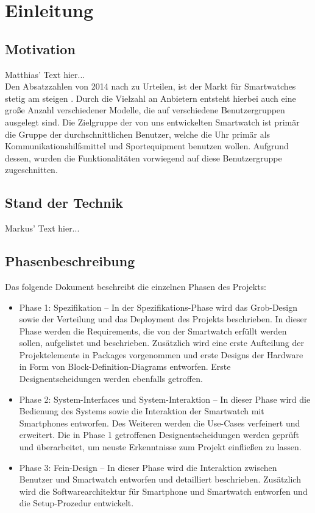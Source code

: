 \chapter{Einleitung}

\section{Motivation}
Matthias' Text hier...\\
Den Absatzzahlen von 2014 nach zu Urteilen, ist der Markt für Smartwatches stetig am steigen . Durch die Vielzahl an Anbietern entsteht hierbei auch eine große Anzahl verschiedener Modelle, die auf verschiedene Benutzergruppen ausgelegt sind. Die Zielgruppe der von uns entwickelten Smartwatch ist primär die Gruppe der durchschnittlichen Benutzer, welche die Uhr primär als Kommunikationshilfsmittel und Sportequipment benutzen wollen. Aufgrund dessen, wurden die Funktionalitäten  vorwiegend auf diese Benutzergruppe zugeschnitten.

\section{Stand der Technik}
Markus' Text hier...

\section{Phasenbeschreibung}
Das folgende Dokument beschreibt die einzelnen Phasen des Projekts:
\begin{itemize}
  \item Phase 1: Spezifikation -- In der Spezifikations-Phase wird das Grob-Design sowie der Verteilung und das Deployment des Projekts beschrieben. In dieser Phase werden die Requirements, die von der Smartwatch erfüllt werden sollen, aufgelistet und beschrieben. Zusätzlich wird eine erste Aufteilung der Projektelemente in Packages vorgenommen und erste Designs der Hardware in Form von Block-Definition-Diagrams entworfen. Erste Designentscheidungen werden ebenfalls getroffen.

  \item Phase 2: System-Interfaces und System-Interaktion -- In dieser Phase wird die Bedienung des Systems sowie die Interaktion der Smartwatch mit Smartphones entworfen. Des Weiteren werden die Use-Cases verfeinert und erweitert. Die in Phase 1 getroffenen Designentscheidungen werden geprüft und überarbeitet, um neuste Erkenntnisse zum Projekt einfließen zu lassen.

  \item Phase 3: Fein-Design -- In dieser Phase wird die Interaktion zwischen Benutzer und Smartwatch entworfen und detailliert beschrieben. Zusätzlich wird die Softwarearchitektur für Smartphone und Smartwatch entworfen und die Setup-Prozedur entwickelt.
\end{itemize}
